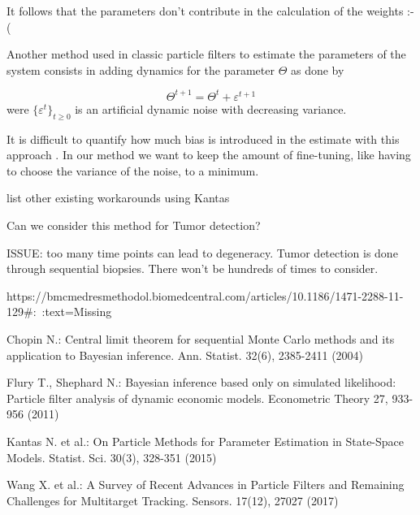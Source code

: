 \documentclass[11pt,a4paper]{article}
\begin{document}
It follows that the parameters don't contribute in the calculation of the weights :-(



Another method used in classic particle filters to estimate the parameters of the system consists in adding dynamics for the parameter $\Theta$ as done by \cite{Flury}

\begin{equation*}
    \Theta^{t+1} = \Theta^t + \varepsilon^{t+1}
\end{equation*}
were $\{\varepsilon^t\}_{t\geq 0}$ is an artificial dynamic noise with decreasing variance.

It is difficult to quantify how much bias is introduced in the estimate with this approach \cite{Kantas}. In our method we want to keep the amount of fine-tuning, like having to choose the variance of the noise, to a minimum.

{\color{red} list other existing workarounds using Kantas}

Can we consider this method for Tumor detection?

ISSUE: too many time points can lead to degeneracy. 
Tumor detection is done through sequential biopsies. There won't be hundreds of times to consider.

https://bmcmedresmethodol.biomedcentral.com/articles/10.1186/1471-2288-11-129#:~:text=Missing%


\begin{thebibliography}{}

Chopin N.: Central limit theorem for sequential Monte Carlo methods and its application to Bayesian inference. Ann. Statist. 32(6), 2385-2411 (2004)

Flury T., Shephard N.: Bayesian inference based only on simulated likelihood: Particle filter analysis of dynamic economic models. Econometric Theory 27, 933-956 (2011)

Kantas N. et al.: On Particle Methods for Parameter Estimation in State-Space Models. Statist. Sci. 30(3), 328-351 (2015)

Wang X. et al.: A Survey of Recent Advances in Particle Filters and Remaining Challenges for Multitarget Tracking. Sensors. 17(12), 27027 (2017)




\end{thebibliography}
\end{document}
